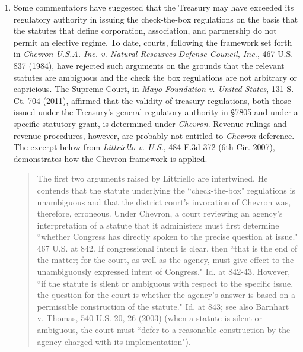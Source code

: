 	\begin{enumerate}

	\item Some commentators have suggested that the Treasury may have exceeded its regulatory authority in issuing the check-the-box regulations on the basis that the statutes that define corporation, association, and partnership do not permit an elective regime.  To date, courts, following the framework set forth in \emph{Chevron U.S.A. Inc. v. Natural Resources Defense Council, Inc.}, 467 U.S. 837 (1984), have rejected such arguments on the grounds that the relevant statutes are ambiguous and the check the box regulations are not arbitrary or capricious.  The Supreme Court, in \emph{Mayo Foundation v. United States}, 131 S. Ct. 704 (2011), affirmed that the validity of treasury regulations, both those issued under the Treasury's general regulatory authority in \S7805 and under a specific statutory grant, is determined under \emph{Chevron}.  Revenue rulings and revenue procedures, however, are probably not entitled to \emph{Chevron} deference.   The excerpt below from \emph{Littriello v. U.S.}, 484 F.3d 372 (6th Cir. 2007), demonstrates how the Chevron framework is applied. 
	\begin{quote}
	The first two arguments raised by Littriello are intertwined. He contends that the statute underlying the ``check-the-box" regulations is unambiguous and that the district court's invocation of Chevron was, therefore, erroneous. Under Chevron, a court reviewing an agency's interpretation of a statute that it administers must first determine ``whether Congress has directly spoken to the precise question at issue." 467 U.S. at 842. If congressional intent is clear, then ``that is the end of the matter; for the court, as well as the agency, must give effect to the unambiguously expressed intent of Congress." Id. at 842-43. However, ``if the statute is silent or ambiguous with respect to the specific issue, the question for the court is whether the agency's answer is based on a permissible construction of the statute." Id. at 843; see also Barnhart v. Thomas, 540 U.S. 20, 26 (2003) (when a statute is silent or ambiguous, the court must ``defer to a reasonable construction by the agency charged with its implementation").


\end{quote}
\end{enumerate}
